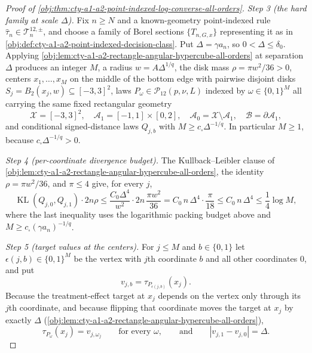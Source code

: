 \documentclass[11pt]{article}
\begin{document}
\begin{proof}[Proof of \cref{obj:thm:cty-a1-a2-point-indexed-log-converse-all-orders}]
\emph{Step 3 (the hard family at scale \(\Delta\)).}
Fix \(n\geq N\) and a known-geometry point-indexed rule
\(\widehat\tau_n\in\mathcal T^{12,\pm}_n\), and choose a family of Borel
sections \(\{T_{n,G,x}\}\) representing it as in
\cref{obj:def:cty-a1-a2-point-indexed-decision-class}.  Put
\(\Delta=\gamma a_n\), so \(0<\Delta\leq\delta_0\).  Applying
\cref{obj:lem:cty-a1-a2-rectangle-angular-hypercube-all-orders} at separation
\(\Delta\) produces an integer \(M\), a radius \(w=A\Delta^{1/q}\), the disk
mass \(\rho=\pi w^2/36>0\), centers \(x_1,\ldots,x_M\) on the middle of the
bottom edge with pairwise disjoint disks \(S_j=B_2(x_j,w)\subseteq[-3,3]^2\),
laws \(P_\omega\in\mathcal P_{12}(p,\nu,L)\) indexed by \(\omega\in\{0,1\}^M\)
all carrying the same fixed rectangular geometry
\[
\mathcal X=[-3,3]^2,\quad
\mathcal A_1=[-1,1]\times[0,2],\quad
\mathcal A_0=\mathcal X\setminus\mathcal A_1,\quad
\mathcal B=\partial\mathcal A_1,
\]
and conditional signed-distance laws \(Q_{j,b}\) with
\(M\geq c_\square\Delta^{-1/q}\).  In particular \(M\geq 1\), because
\(c_\square\Delta^{-1/q}>0\).

\emph{Step 4 (per-coordinate divergence budget).}
The Kullback--Leibler clause of
\cref{obj:lem:cty-a1-a2-rectangle-angular-hypercube-all-orders}, the identity
\(\rho=\pi w^2/36\), and \(\pi\leq4\) give, for every \(j\),
\[
\operatorname{KL}(Q_{j,0},Q_{j,1})\cdot 2n\rho
\leq
\frac{C_0\Delta^4}{w^2}\cdot 2n\,\frac{\pi w^2}{36}
=
C_0\,n\,\Delta^4\cdot\frac{\pi}{18}
\leq
C_0\,n\,\Delta^4
\leq
\frac14\log M ,
\]
where the last inequality uses the logarithmic packing budget above and
\(M\geq c_\square(\gamma a_n)^{-1/q}\).

\emph{Step 5 (target values at the centers).}
For \(j\leq M\) and \(b\in\{0,1\}\) let \(\epsilon(j,b)\in\{0,1\}^M\) be the
vertex with \(j\)th coordinate \(b\) and all other coordinates \(0\), and put
\[
v_{j,b}=\tau_{P_{\epsilon(j,b)}}(x_j).
\]
Because the treatment-effect target at \(x_j\) depends on the vertex only
through its \(j\)th coordinate, and because flipping that coordinate moves the
target at \(x_j\) by exactly \(\Delta\)
(\cref{obj:lem:cty-a1-a2-rectangle-angular-hypercube-all-orders}),
\[
\tau_{P_\omega}(x_j)=v_{j,\omega_j}
\qquad\text{for every }\omega,
\qquad\text{and}\qquad
|v_{j,1}-v_{j,0}|=\Delta .
\]


\end{proof}
\end{document}
